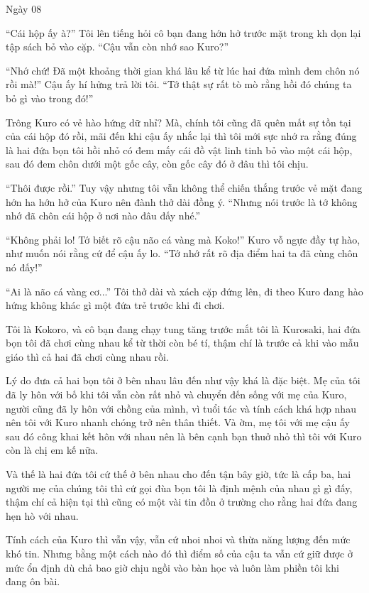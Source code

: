 {Ngày 08}
{

``Cái hộp ấy à?'' Tôi lên tiếng hỏi cô bạn đang hớn hở trước mặt trong
kh dọn lại tập sách bỏ vào cặp. ``Cậu vẫn còn nhớ sao Kuro?''

``Nhớ chứ! Đã một khoảng thời gian khá lâu kể từ lúc hai đứa mình đem
chôn nó rồi mà!'' Cậu ấy hí hửng trả lời tôi. ``Tớ thật sự rất tò mò
rằng hồi đó chúng ta bỏ gì vào trong đó!''

Trông Kuro có vẻ hào hứng dữ nhỉ? Mà, chính tôi cũng đã quên mất sự tồn
tại của cái hộp đó rồi, mãi đến khi cậu ấy nhắc lại thì tôi mới sực nhớ
ra rằng đúng là hai đứa bọn tôi hồi nhỏ có đem mấy cái đồ vật linh tinh
bỏ vào một cái hộp, sau đó đem chôn dưới một gốc cây, còn gốc cây đó ở
đâu thì tôi chịu.

``Thôi được rồi.'' Tuy vậy nhưng tôi vẫn không thể chiến thắng trước vẻ
mặt đang hớn ha hớn hở của Kuro nên đành thở dài đồng ý. ``Nhưng nói
trước là tớ không nhớ đã chôn cái hộp ở nơi nào đâu đấy nhé.''

``Không phải lo! Tớ biết rõ cậu não cá vàng mà Koko!'' Kuro vỗ ngực đầy
tự hào, như muốn nói rằng cứ để cậu ấy lo. ``Tớ nhớ rất rõ địa điểm hai
ta đã cùng chôn nó đấy!''

``Ai là não cá vàng cơ...'' Tôi thở dài và xách cặp đứng lên, đi theo
Kuro đang hào hứng không khác gì một đứa trẻ trước khi đi chơi.

Tôi là Kokoro, và cô bạn đang chạy tung tăng trước mắt tôi là Kurosaki,
hai đứa bọn tôi đã chơi cùng nhau kể từ thời còn bé tí, thậm chí là
trước cả khi vào mẫu giáo thì cả hai đã chơi cùng nhau rồi.

Lý do đưa cả hai bọn tôi ở bên nhau lâu đến như vậy khá là đặc biệt. Mẹ
của tôi đã ly hôn với bố khi tôi vẫn còn rất nhỏ và chuyển đến sống với
mẹ của Kuro, người cũng đã ly hôn với chồng của mình, vì tuổi tác và
tính cách khá hợp nhau nên tôi với Kuro nhanh chóng trở nên thân thiết.
Và ờm, mẹ tôi với mẹ cậu ấy sau đó công khai kết hôn với nhau nên là bên
cạnh bạn thuở nhỏ thì tôi với Kuro còn là chị em kế nữa.

Và thế là hai đứa tôi cứ thế ở bên nhau cho đến tận bây giờ, tức là cấp
ba, hai người mẹ của chúng tôi thì cứ gọi đùa bọn tôi là định mệnh của
nhau gì gì đấy, thậm chí cả hiện tại thì cũng có một vài tin đồn ở
trường cho rằng hai đứa đang hẹn hò với nhau.

Tính cách của Kuro thì vẫn vậy, vẫn cứ nhoi nhoi và thừa năng lượng đến
mức khó tin. Nhưng bằng một cách nào đó thì điểm số của cậu ta vẫn cứ
giữ được ở mức ổn định dù chả bao giờ chịu ngồi vào bàn học và luôn làm
phiền tôi khi đang ôn bài.

}
